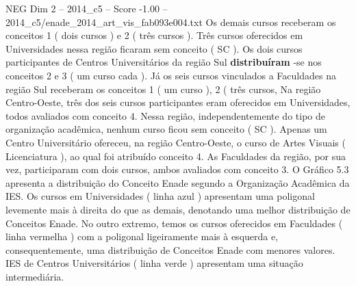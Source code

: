 \begin{textsample}{NEG Dim 2 – 2014\_c5 – Score -1.00 – 2014\_c5/enade\_2014\_art\_vis\_fab093e004.txt}
Os demais cursos receberam os conceitos 1 ( dois cursos ) e 2 ( três cursos ).
Três cursos oferecidos em Universidades nessa região ficaram sem conceito ( SC ).
Os dois cursos participantes de Centros Universitários da região Sul \textbf{distribuíram} -se nos conceitos 2 e 3 ( um curso cada ).
Já os seis cursos vinculados a Faculdades na região Sul receberam os conceitos 1 ( um curso ), 2 ( três cursos, Na região Centro-Oeste, três dos seis cursos participantes eram oferecidos em Universidades, todos avaliados com conceito 4.
Nessa região, independentemente do tipo de organização acadêmica, nenhum curso ficou sem conceito ( SC ).
Apenas um Centro Universitário ofereceu, na região Centro-Oeste, o curso de Artes Visuais ( Licenciatura ), ao qual foi atribuído conceito 4.
As Faculdades da região, por sua vez, participaram com dois cursos, ambos avaliados com conceito 3.
O Gráfico 5.3 apresenta a distribuição do Conceito Enade segundo a Organização Acadêmica da IES.
Os cursos em Universidades ( linha azul ) apresentam uma poligonal levemente mais à direita do que as demais, denotando uma melhor distribuição de Conceitos Enade.
No outro extremo, temos os cursos oferecidos em Faculdades ( linha vermelha ) com a poligonal ligeiramente mais à esquerda e, consequentemente, uma distribuição de Conceitos Enade com menores valores.
IES de Centros Universitários ( linha verde ) apresentam uma situação intermediária.

\end{textsample}
